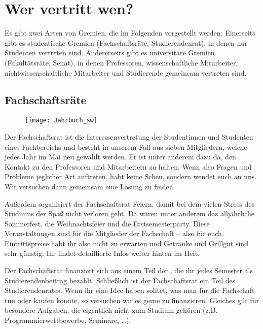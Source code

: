 
\section{Wer vertritt wen?}
\label{vertretung}

Es gibt zwei Arten von Gremien, die im Folgenden vorgestellt werden: Einerseits gibt es studentische Gremien (Fachschaftsräte, Studierendenrat), in denen nur Studenten vertreten sind. Andererseits gibt es universitäre Gremien (Fakultätsräte, Senat), in denen Professoren, wissenschaftliche Mitarbeiter, nichtwissenschaftliche Mitarbeiter und Studierende gemeinsam vertreten sind.

\subsection{Fachschaftsräte}

\begin{figure}[h]
    \centering
    \texttt{[image: Jahrbuch\_sw]}
             \label{fig:fsr}
\end{figure}

\newpage
Der Fachschaftsrat ist die Interessenvertretung der Studentinnen und Studenten eines Fachbereichs und besteht in unserem Fall aus sieben Mitgliedern, welche jedes Jahr im Mai neu gewählt werden.
Er ist unter anderem dazu da, den Kontakt zu den Professoren und Mitarbeitern zu halten.
Wenn also Fragen und Probleme jeglicher Art auftreten, habt keine Scheu, sondern wendet euch an uns.
Wir versuchen dann gemeinsam eine Lösung zu finden.

Außerdem organisiert der Fachschaftsrat Feiern, damit bei dem vielen Stress des Studiums der Spaß nicht verloren geht.
Da wären unter anderem das alljährliche Sommerfest, die Weihnachtsfeier und die Erstsemesterparty.
Diese Veranstaltungen sind für die Mitglieder der Fachschaft -- also für euch.
Eintrittspreise habt ihr also nicht zu erwarten und Getränke und Grillgut sind sehr günstig.
Ihr findet detaillierte Infos weiter hinten im Heft.

Der Fachschaftsrat finanziert sich aus einem Teil der , die ihr jedes Semester als Studierendenbeitrag bezahlt.
Schließlich ist der Fachschaftsrat ein Teil des Studierendenrates.
Wenn ihr eine Idee haben solltet, was man für die Fachschaft tun oder kaufen könnte, so versuchen wir es gerne zu finanzieren.
Gleiches gilt für besondere Aufgaben, die eigentlich nicht zum Studium gehören (\;z.B. Programmierwettbewerbe, Seminare, \ldots).


